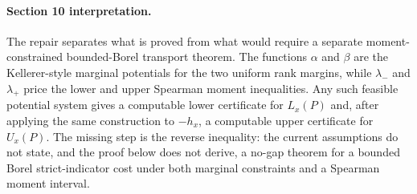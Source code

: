 \paragraph{Section 10 interpretation.}
The repair separates what is proved from what would require a separate moment-constrained bounded-Borel transport theorem.  The functions \(\alpha\) and \(\beta\) are the Kellerer-style marginal potentials for the two uniform rank margins, while \(\lambda_-\) and \(\lambda_+\) price the lower and upper Spearman moment inequalities.  Any such feasible potential system gives a computable lower certificate for \(L_x(P)\) and, after applying the same construction to \(-h_x\), a computable upper certificate for \(U_x(P)\).  The missing step is the reverse inequality: the current assumptions do not state, and the proof below does not derive, a no-gap theorem for a bounded Borel strict-indicator cost under both marginal constraints and a Spearman moment interval.

